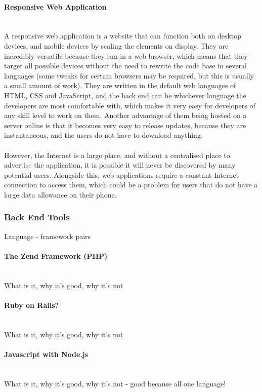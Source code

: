 \paragraph{Responsive Web Application}\ \\
A responsive web application is a website that can function both on desktop devices, and mobile devices by scaling the elements on display. They are incredibly versatile because they run in a web browser, which means that they target all possible devices without the need to rewrite the code base in several languages (some tweaks for certain browsers may be required, but this is usually a small amount of work). They are written in the default web languages of HTML, CSS and JavaScript, and the back end can be whichever language the developers are most comfortable with, which makes it very easy for developers of any skill level to work on them. Another advantage of them being hosted on a server online is that it becomes very easy to release updates, because they are instantaneous, and the users do not have to download anything.\\
\ \\
However, the Internet is a large place, and without a centralised place to advertise the application, it is possible it will never be discovered by many potential users. Alongside this, web applications require a constant Internet connection to access them, which could be a problem for users that do not have a large data allowance on their phone.


\newpage 
\subsubsection{Back End Tools}
{\color{purple}
Language  - framework pairs
}

\paragraph{The Zend Framework (PHP)}\ \\
{\color{red} What is it, why it's good, why it's not}

\paragraph{Ruby on Rails?}\ \\
{\color{red} What is it, why it's good, why it's not}

\paragraph{Javascript with Node.js}\ \\
{\color{red} What is it, why it's good, why it's not - good because all one language!}


